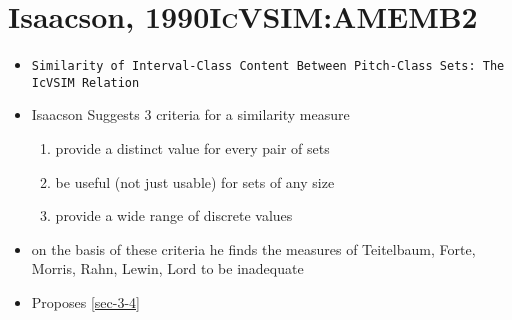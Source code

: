 \documentclass[11pt]{article}
\begin{document}
\section{Isaacson, 1990\hfill{}\textsc{IcVSIM:AMEMB2}}
\label{sec-7}
\begin{itemize}
\item \texttt{Similarity of Interval-Class Content Between Pitch-Class Sets:
    The IcVSIM Relation}
\item Isaacson Suggests 3 criteria for a similarity measure
\begin{enumerate}
\item provide a distinct value for every pair of sets
\item be useful (not just usable) for sets of any size
\item provide a wide range of discrete values
\end{enumerate}
\item on the basis of these criteria he finds the measures of
Teitelbaum, Forte, Morris, Rahn, Lewin, Lord to be inadequate
\item Proposes \ref{sec-3-4}
\end{itemize}
\end{document}
